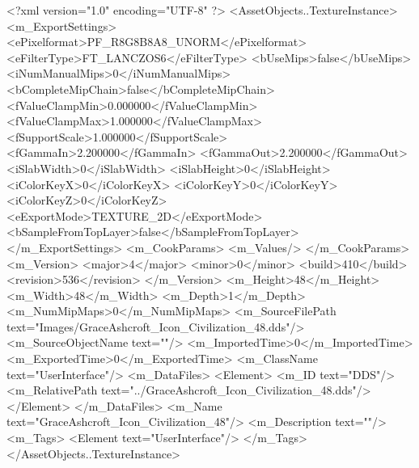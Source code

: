 <?xml version="1.0" encoding="UTF-8" ?>
<AssetObjects..TextureInstance>
	<m_ExportSettings>
		<ePixelformat>PF_R8G8B8A8_UNORM</ePixelformat>
		<eFilterType>FT_LANCZOS6</eFilterType>
		<bUseMips>false</bUseMips>
		<iNumManualMips>0</iNumManualMips>
		<bCompleteMipChain>false</bCompleteMipChain>
		<fValueClampMin>0.000000</fValueClampMin>
		<fValueClampMax>1.000000</fValueClampMax>
		<fSupportScale>1.000000</fSupportScale>
		<fGammaIn>2.200000</fGammaIn>
		<fGammaOut>2.200000</fGammaOut>
		<iSlabWidth>0</iSlabWidth>
		<iSlabHeight>0</iSlabHeight>
		<iColorKeyX>0</iColorKeyX>
		<iColorKeyY>0</iColorKeyY>
		<iColorKeyZ>0</iColorKeyZ>
		<eExportMode>TEXTURE_2D</eExportMode>
		<bSampleFromTopLayer>false</bSampleFromTopLayer>
	</m_ExportSettings>
	<m_CookParams>
		<m_Values/>
	</m_CookParams>
	<m_Version>
		<major>4</major>
		<minor>0</minor>
		<build>410</build>
		<revision>536</revision>
	</m_Version>
	<m_Height>48</m_Height>
	<m_Width>48</m_Width>
	<m_Depth>1</m_Depth>
	<m_NumMipMaps>0</m_NumMipMaps>
	<m_SourceFilePath text="Images/GraceAshcroft_Icon_Civilization_48.dds"/>
	<m_SourceObjectName text=""/>
	<m_ImportedTime>0</m_ImportedTime>
	<m_ExportedTime>0</m_ExportedTime>
	<m_ClassName text="UserInterface"/>
	<m_DataFiles>
		<Element>
			<m_ID text="DDS"/>
			<m_RelativePath text="../GraceAshcroft_Icon_Civilization_48.dds"/>
		</Element>
	</m_DataFiles>
	<m_Name text="GraceAshcroft_Icon_Civilization_48"/>
	<m_Description text=""/>
	<m_Tags>
		<Element text="UserInterface"/>
	</m_Tags>
</AssetObjects..TextureInstance>
